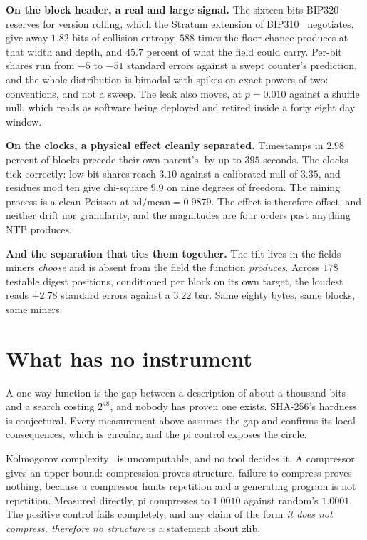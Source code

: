 \textbf{On the block header, a real and large signal.} The sixteen bits BIP320~\cite{src:BIP320} reserves for version rolling, which the Stratum extension of BIP310~\cite{src:BIP310} negotiates, give away \(1.82\) bits of collision entropy, \(588\) times the floor chance produces at that width and depth, and \(45.7\) percent of what the field could carry. Per-bit shares run from \(-5\) to \(-51\) standard errors against a swept counter's prediction, and the whole distribution is bimodal with spikes on exact powers of two: conventions, and not a sweep. The leak also moves, at \(p = 0.010\) against a shuffle null, which reads as software being deployed and retired inside a forty eight day window.

\textbf{On the clocks, a physical effect cleanly separated.} Timestamps in \(2.98\) percent of blocks precede their own parent's, by up to \(395\) seconds. The clocks tick correctly: low-bit shares reach \(3.10\) against a calibrated null of \(3.35\), and residues mod ten give chi-square \(9.9\) on nine degrees of freedom. The mining process is a clean Poisson at \(\mathrm{sd}/\mathrm{mean} = 0.9879\). The effect is therefore offset, and neither drift nor granularity, and the magnitudes are four orders past anything NTP produces.

\textbf{And the separation that ties them together.} The tilt lives in the fields miners \emph{choose} and is absent from the field the function \emph{produces}. Across \(178\) testable digest positions, conditioned per block on its own target, the loudest reads \(+2.78\) standard errors against a \(3.22\) bar. Same eighty bytes, same blocks, same miners.

\section{What has no instrument}

A one-way function is the gap between a description of about a thousand bits and a search costing \(2^{48}\), and nobody has proven one exists. SHA-256's hardness is conjectural. Every measurement above assumes the gap and confirms its local consequences, which is circular, and the pi control exposes the circle.

Kolmogorov complexity~\cite{src:Kolmogorov-1965} is uncomputable, and no tool decides it. A compressor gives an upper bound: compression proves structure, failure to compress proves nothing, because a compressor hunts repetition and a generating program is not repetition. Measured directly, pi compresses to \(1.0010\) against random's \(1.0001\). The positive control fails completely, and any claim of the form \emph{it does not compress, therefore no structure} is a statement about zlib.

